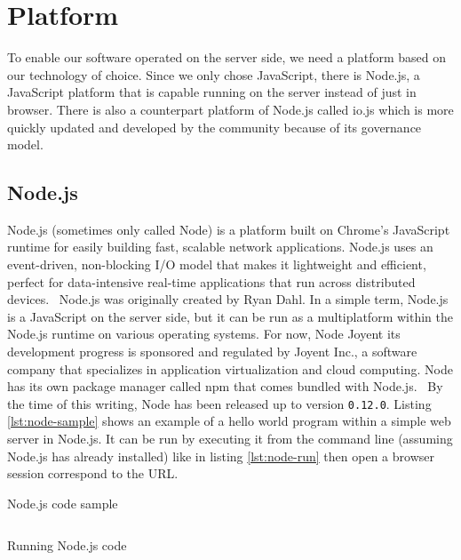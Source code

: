 \section{Platform}
\label{sec:platform}

To enable our software operated on the server side, we need a platform based on our technology of choice.
Since we only chose JavaScript, there is Node.js, a JavaScript platform that is capable running on the server instead of just in browser.
There is also a counterpart platform of Node.js called io.js which is more quickly updated and developed by the community because of its governance model.

\subsection{Node.js}

Node.js\textsuperscript{\textregistered} (sometimes only called Node) is
a platform built on Chrome's JavaScript runtime for easily building fast, scalable network applications.
Node.js uses an event-driven, non-blocking I/O model that makes it lightweight and efficient, perfect for data-intensive real-time applications that run across distributed devices.~\autocite{Joyent:2015:Node}
Node.js was originally created by Ryan Dahl.
In a simple term, Node.js is a JavaScript on the server side, but it can be run as a multiplatform within the Node.js runtime on various operating systems.
For now, Node Joyent its development progress is sponsored and regulated by Joyent Inc., a software company that specializes in application virtualization and cloud computing.
Node has its own package manager called \ac{npm} that comes bundled with Node.js.~\autocite{Vincent:2014:npm}
By the time of this writing, Node has been released up to version \verb|0.12.0|.
Listing \autoref{lst:node-sample} shows an example of a hello world program within a simple web server in Node.js.
It can be run by executing it from the command line (assuming Node.js has already installed) like in listing \autoref{lst:node-run} then open a browser session correspond to the \ac{URL}.

\begin{listing}[ht]
\caption{Node.js code sample}
\inputminted{javascript}{\dir/include/node-sample.js}
\label{lst:node-sample}
\end{listing}

\begin{listing}[ht]
\caption{Running Node.js code}
\inputminted{shell-session}{\dir/include/node-run.shell-session}
\label{lst:node-run}
\end{listing}

